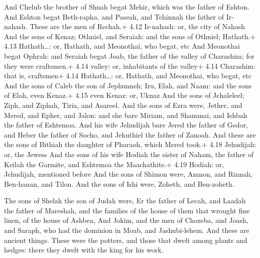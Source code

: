  And Chelub the brother of Shuah begat Mehir, which was
the father of Eshton.  And Eshton begat Beth-rapha, and
Paseah, and Tehinnah the father of Ir-nahash. These are the men of
Rechah.+ 4.12 Ir-nahash: or, the city of Nahash  And the
sons of Kenaz; Othniel, and Seraiah: and the sons of Othniel; Hathath.+
4.13 Hathath\ldots: or, Hathath, and Meonothai, who begat, etc
 And Meonothai begat Ophrah: and Seraiah begat Joab, the
father of the valley of Charashim; for they were craftsmen.+ 4.14
valley: or, inhabitants of the valley+ 4.14 Charashim: that is,
craftsmen+ 4.14 Hathath\ldots: or, Hathath, and Meonothai, who begat,
etc  And the sons of Caleb the son of Jephunneh; Iru, Elah,
and Naam: and the sons of Elah, even Kenaz.+ 4.15 even Kenaz: or, Uknaz
 And the sons of Jehaleleel; Ziph, and Ziphah, Tiria, and
Asareel.  And the sons of Ezra were, Jether, and Mered, and
Epher, and Jalon: and she bare Miriam, and Shammai, and Ishbah the
father of Eshtemoa.  And his wife Jehudijah bare Jered the
father of Gedor, and Heber the father of Socho, and Jekuthiel the father
of Zanoah. And these are the sons of Bithiah the daughter of Pharaoh,
which Mered took.+ 4.18 Jehudijah: or, the Jewess  And the
sons of his wife Hodiah the sister of Naham, the father of Keilah the
Garmite, and Eshtemoa the Maachathite.+ 4.19 Hodiah: or, Jehudijah,
mentioned before  And the sons of Shimon were, Amnon, and
Rinnah, Ben-hanan, and Tilon. And the sons of Ishi were, Zoheth, and
Ben-zoheth.

 The sons of Shelah the son of Judah were, Er the father
of Lecah, and Laadah the father of Mareshah, and the families of the
house of them that wrought fine linen, of the house of Ashbea,
 And Jokim, and the men of Chozeba, and Joash, and Saraph,
who had the dominion in Moab, and Jashubi-lehem. And these are ancient
things.  These were the potters, and those that dwelt among
plants and hedges: there they dwelt with the king for his work.

